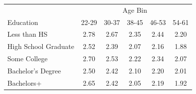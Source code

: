 \begin{tabular}{lccccc}
\hline\hline
 & \multicolumn{5}{c}{Age Bin} \\
Education & 22-29 & 30-37 & 38-45 & 46-53 & 54-61 \\
\hline
Less than HS&2.78&2.67&2.35&2.44&2.20\\
High School Graduate&2.52&2.39&2.07&2.16&1.88\\
Some College&2.70&2.53&2.22&2.34&2.07\\
Bachelor's Degree&2.50&2.42&2.10&2.20&2.01\\
Bachelors+&2.65&2.42&2.05&2.19&1.92\\
\hline\hline
\end{tabular}
